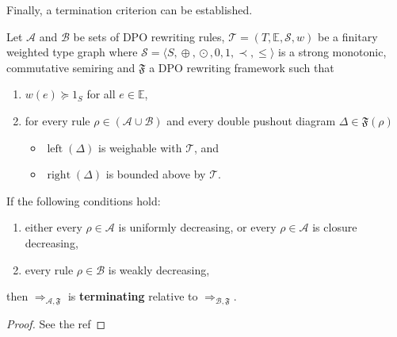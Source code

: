 Finally, a termination criterion can be established.
\begin{theorem} 
    \label{thm:termination_grs}
    Let $\mathcal{A}$ and $\mathcal{B}$ be sets of DPO rewriting rules, $\mathcal{T} \mathop{=} (T,\mathbb{E}, \mathcal{S}, w)$ be a finitary weighted type graph where $\mathcal{S} \mathop{=} \langle S, \mathop{\oplus}, \mathop{\odot}, 0, 1, \prec, \leq \rangle$ is a strong monotonic, commutative semiring and $\mathfrak{F}$ a DPO rewriting framework such that

     \begin{enumerate}
        \item\label{thm1:hyp3} $w(e) \mathop{\succeq} 1_S$ for all $e \mathop{\in} \mathbb{E}$,
        \item for every rule $\rho \mathop{\in} (\mathcal{A }\mathop{\cup} \mathcal{B })$ and every double pushout diagram  
        $\Delta \mathop{\in} \mathfrak{F}(\rho)$ 
        \begin{itemize}
            \item \(\operatorname{left}(\Delta)\) is weighable with \(\mathcal{T}\), and
            \item \(\operatorname{right}(\Delta)\) is bounded above by \(\mathcal{T}\). 
        \end{itemize}
    \end{enumerate}       

    \noindent If the following conditions hold:
    \begin{enumerate}
        \item either every $\rho \mathop{\in} \mathcal{A}$ is uniformly decreasing, or every $\rho \mathop{\in} \mathcal{A}$ is closure decreasing,
        \item every rule $\rho \mathop{\in} \mathcal{B}$ is weakly decreasing,
    \end{enumerate}
    then $\mathop{\Rightarrow}_{\mathcal{A},\mathfrak{F}}$ is \textbf{terminating} relative to $\mathop{\Rightarrow}_{\mathcal{B},\mathfrak{F}}$.
\end{theorem} 
\begin{proof}
    See the 
    ref
\end{proof}